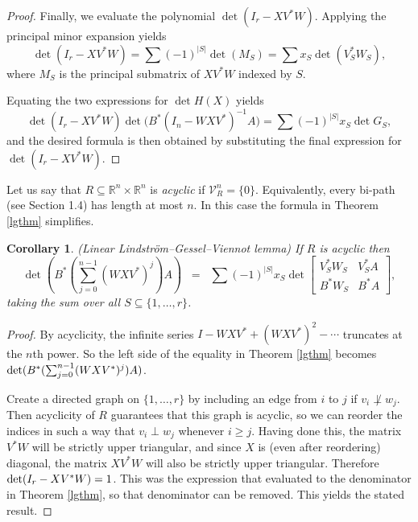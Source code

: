 \documentclass{amsart}
\newtheorem{cor}[thm]{Corollary}
\theoremstyle{definition}
\begin{document}
\begin{proof}
Finally, we evaluate the polynomial $\det(I_r - X V^* W)$. Applying the principal minor expansion yields $$\det(I_r - X V^* W) = \sum (-1)^{|S|} \det(M_S) = \sum x_S \det(V_S^* W_S),$$ where $M_S$ is the principal submatrix of $X V^* W$ indexed by $S$.

Equating the two expressions for $\det H(X)$ yields $$ \det(I_r - X V^* W) \det\Big( B^* (I_n - W X V^*)^{-1} A \Big) = \sum (-1)^{|S|} x_S \det G_S,$$ and the desired formula is then obtained by substituting the final expression for $\det(I_r - X V^* W)$.
\end{proof}

Let us say that $R \subseteq \mathbb{R}^n \times \mathbb{R}^n$ is {\it acyclic} if $\mathcal{V}_R^n = \{0\}$. Equivalently, every bi-path (see Section 1.4) has length at most $n$. In this case the formula in Theorem \ref{lgthm} simplifies.

\begin{cor}\label{lgcor} (Linear Lindström–Gessel–Viennot lemma)
If $R$ is acyclic then $$ \det \left( B^* \left( \sum_{j=0}^{n-1} (W X V^*)^j \right) A \right) \;\;=\;\; \sum (-1)^{|S|} x_S \det \left[\begin{matrix} V_S^* W_S & V_S^* A \\ B^* W_S & B^* A \end{matrix}\right],$$ taking the sum over all $S \subseteq \{1, \ldots, r\}$.
\end{cor}

\begin{proof}
By acyclicity, the infinite series $I -  WXV^* + (WXV^*)^2 - \cdots$ truncates at the $n$th power. So the left side of the equality in Theorem \ref{lgthm} becomes ${\rm det}(B^*(\sum_{j=0}^{n-1} (WXV^*)^j)A)$.

Create a directed graph on $\{1, \ldots, r\}$ by including an edge from $i$ to $j$ if $v_i \not\perp w_j$. Then acyclicity of $R$ guarantees that this graph is acyclic, so we can reorder the indices in such a way that $v_i \perp w_j$ whenever $i \geq j$. Having done this, the matrix $V^*W$ will be strictly upper triangular, and since $X$ is (even after reordering) diagonal, the matrix $XV^*W$ will also be strictly upper triangular. Therefore ${\rm det}(I_r - XV^*W) = 1$. This was the expression that evaluated to the denominator in Theorem \ref{lgthm}, so that denominator can be removed. This yields the stated result.
\end{proof}
\end{document}
